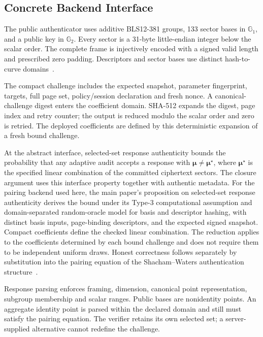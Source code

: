\documentclass[10pt,journal,onecolumn]{IEEEtran}
\begin{document}
\subsection{Concrete Backend Interface}\label{sec:backend-interface}
The public authenticator uses additive BLS12-381 groups, 133 sector bases
in $\mathbb G_1$, and a public key in $\mathbb G_2$. Every sector is a
31-byte little-endian integer below the scalar order. The complete frame
is injectively encoded with a signed valid length and prescribed zero padding.
Descriptors and sector bases use distinct hash-to-curve domains~\cite{RFC9380}.

The compact challenge includes the expected snapshot, parameter fingerprint,
targets, full page set, policy/session declaration and fresh nonce.
A canonical-challenge digest enters the coefficient domain. SHA-512 expands
the digest, page index and retry counter; the output is reduced modulo the
scalar order and zero is retried. The deployed coefficients are defined by
this deterministic expansion of a fresh bound challenge.

At the abstract interface, selected-set response authenticity bounds the
probability that any adaptive audit accepts a response with
$\boldsymbol\mu\ne\boldsymbol\mu^\star$, where $\boldsymbol\mu^\star$ is the
specified linear combination of the committed ciphertext sectors. The closure
argument uses this interface property together with authentic metadata.
For the pairing backend used here, the main paper's proposition on selected-set
response authenticity derives the bound under its Type-3 computational
assumption and domain-separated random-oracle model for basis and descriptor
hashing, with distinct basis inputs, page-binding descriptors, and the
expected signed snapshot. Compact coefficients define the checked linear
combination. The reduction applies to the coefficients determined by each
bound challenge and does not require them to be independent uniform draws.
Honest correctness follows separately by substitution into the pairing
equation of the Shacham--Waters authentication structure~\cite{ShachamWaters2013}.

Response parsing enforces framing, dimension, canonical point representation,
subgroup membership and scalar ranges. Public bases are nonidentity points.
An aggregate identity point is parsed within the declared domain and still
must satisfy the pairing equation. The verifier retains its own selected
set; a server-supplied alternative cannot redefine the challenge.
\end{document}
